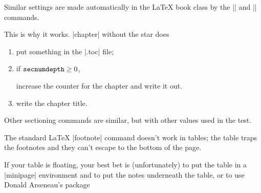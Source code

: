 Similar settings are made automatically in the \LaTeX{} book class by
the |\frontmatter| and |\backmatter| commands.

This is why it works. 
\cs|chapter| without the star does
\begin{enumerate}
\item put something in the |.toc| file;
\htmlignore
\item if $\mbox{\texttt{secnumdepth}} \geq 0$,
\endhtmlignore
{}
      increase the counter for the chapter and write it out.
\item write the chapter title.
\end{enumerate}
Other sectioning commands are similar, but with other values 
used in the test.

The standard \LaTeX{} \cs|footnote| command doesn't work in tables; the table
traps the footnotes and they can't escape to the bottom of the page.

If your table is floating, your best bet is (unfortunately) to put the
table in a |minipage| environment and to put the notes
underneath the table, or to use Donald Arseneau's package

